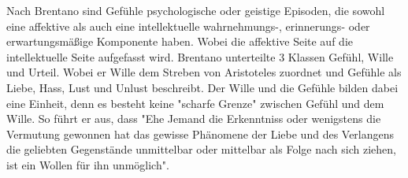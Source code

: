 Nach Brentano sind Gefühle psychologische oder geistige Episoden, die sowohl eine affektive als auch eine intellektuelle wahrnehmungs-, erinnerungs- oder erwartungsmäßige Komponente haben. Wobei die affektive Seite auf die intellektuelle Seite aufgefasst wird. \cite{moser_philosophie_2016} Brentano unterteilte 3 Klassen Gefühl, Wille und Urteil. Wobei er Wille dem Streben von Aristoteles zuordnet und Gefühle als Liebe, Hass, Lust und Unlust beschreibt. Der Wille und die Gefühle bilden dabei eine Einheit, denn es besteht keine "scharfe Grenze" zwischen Gefühl und dem Wille. So führt er aus, dass "Ehe Jemand die Erkenntniss oder wenigstens die Vermutung gewonnen hat das gewisse Phänomene der Liebe und des Verlangens die geliebten Gegenstände unmittelbar oder mittelbar als Folge nach sich ziehen, ist ein Wollen für ihn unmöglich"\cite{franz_clemens_brentano_psychologie_1874}.\\ 


